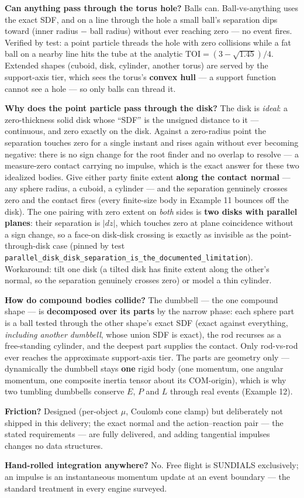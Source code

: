 \documentclass[11pt]{article}
\newcommand{\code}[1]{\texttt{#1}}
\begin{document}
\textbf{Can anything pass through the torus hole?} Balls can.
Ball-vs-anything uses the exact SDF, and on a line through the hole a small
ball's separation dips toward (inner radius $-$ ball radius) without ever
reaching zero --- no event fires. Verified by test: a point particle threads
the hole with zero collisions while a fat ball on a nearby line hits the
tube at the analytic $\mathrm{TOI} = (3 - \sqrt{1.45})/4$. Extended shapes
(cuboid, disk, cylinder, another torus) are served by the support-axis tier,
which sees the torus's \textbf{convex hull} --- a support function cannot
see a hole --- so only balls can thread it.

\textbf{Why does the point particle pass through the disk?} The disk is
\emph{ideal}: a zero-thickness solid disk whose ``SDF'' is the unsigned
distance to it --- continuous, and zero exactly on the disk. Against a
zero-radius point the separation touches zero for a single instant and rises
again without ever becoming negative: there is no sign change for the root
finder and no overlap to resolve --- a measure-zero contact carrying no
impulse, which is the exact answer for these two idealized bodies. Give
either party finite extent \textbf{along the contact normal} --- any
sphere radius, a cuboid, a cylinder --- and the separation genuinely
crosses zero and the contact fires (every finite-size body in Example 11
bounces off the disk). The one pairing with zero extent on \emph{both}
sides is \textbf{two disks with parallel planes}: their separation is
$|dz|$, which touches zero at plane coincidence without a sign change, so
a face-on disk-disk crossing is exactly as invisible as the
point-through-disk case (pinned by test
\code{parallel\_disk\_disk\_separation\_is\_the\_documented\_limitation}).
Workaround: tilt one disk (a tilted disk has finite extent along the
other's normal, so the separation genuinely crosses zero) or model a thin
cylinder.

\textbf{How do compound bodies collide?} The dumbbell --- the one compound
shape --- is \textbf{decomposed over its parts} by the narrow phase: each
sphere part is a ball tested through the other shape's exact SDF (exact
against everything, \emph{including another dumbbell}, whose union SDF is
exact), the rod recurses as a free-standing cylinder, and the deepest part
supplies the contact. Only rod-vs-rod ever reaches the approximate
support-axis tier. The parts are geometry only --- dynamically the
dumbbell stays \textbf{one} rigid body (one momentum, one angular
momentum, one composite inertia tensor about its COM-origin), which is why
two tumbling dumbbells conserve $E$, $P$ and $L$ through real events
(Example 12).

\textbf{Friction?} Designed (per-object $\mu$, Coulomb cone clamp) but
deliberately not shipped in this delivery; the exact normal and the
action--reaction pair --- the stated requirements --- are fully delivered, and
adding tangential impulses changes no data structures.

\textbf{Hand-rolled integration anywhere?} No. Free flight is SUNDIALS
exclusively; an impulse is an instantaneous momentum update at an event
boundary --- the standard treatment in every engine surveyed.
\end{document}
